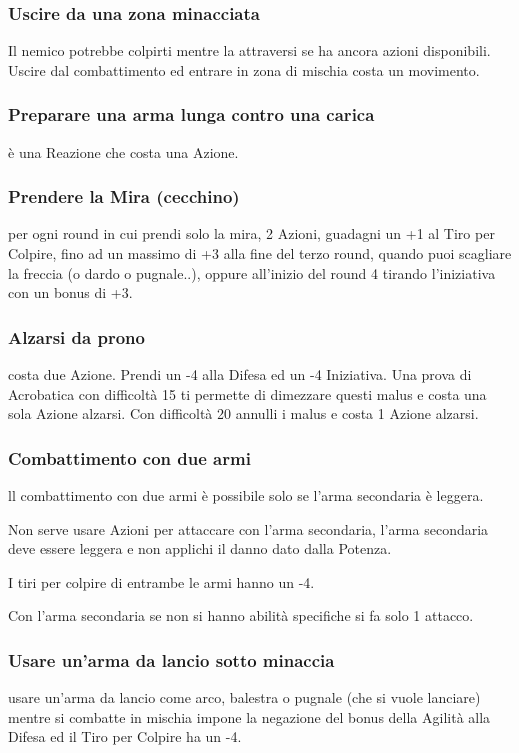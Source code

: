 \documentclass[a4paper,11pt,twoside,openany]{book}
\begin{document}
\subsubsection{Uscire da una zona minacciata} Il nemico potrebbe colpirti mentre la attraversi se ha ancora azioni disponibili. Uscire dal combattimento ed entrare in zona di mischia costa un movimento.

\subsubsection{Preparare una arma lunga contro una carica} è una Reazione che costa una Azione.

\subsubsection{Prendere la Mira (cecchino)} per ogni round in cui prendi solo la mira, 2 Azioni, guadagni un +1 al Tiro per Colpire, fino ad un massimo di +3 alla fine del terzo round, quando puoi scagliare la freccia (o dardo o pugnale..), oppure all'inizio del round 4 tirando l'iniziativa con un bonus di +3.

\subsubsection{Alzarsi da prono} costa due Azione. Prendi un -4 alla Difesa ed un -4 Iniziativa. Una prova di Acrobatica con difficoltà 15 ti permette di dimezzare questi malus e costa una sola Azione alzarsi. Con difficoltà 20 annulli i malus e costa 1 Azione alzarsi.

\subsubsection{Combattimento con due armi} ll combattimento con due armi è possibile solo se l'arma secondaria è leggera.

Non serve usare Azioni per attaccare con l'arma secondaria, l'arma secondaria deve essere leggera e non applichi il danno dato dalla Potenza.

I tiri per colpire di entrambe le armi hanno un -4.

Con l'arma secondaria se non si hanno abilità specifiche si fa solo 1 attacco.

\subsubsection{Usare un'arma da lancio sotto minaccia} usare un'arma da lancio come arco, balestra o pugnale (che si vuole lanciare) mentre si combatte in mischia impone la negazione del bonus della Agilità alla Difesa ed il Tiro per Colpire ha un -4.
\end{document}
